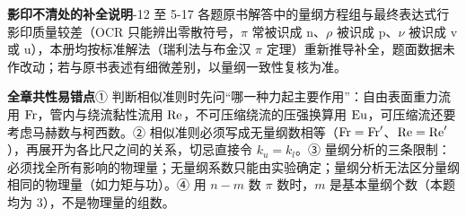 \begin{tishi}
\noindent\textbf{影印不清处的补全说明}-12 至 5-17 各题原书解答中的量纲方程组与最终表达式行影印质量较差（OCR 只能辨出零散符号，$\pi$ 常被识成 n、$\rho$ 被识成 p、$\nu$ 被识成 v 或 u），本册均按标准解法（瑞利法与布金汉 $\pi$ 定理）重新推导补全，题面数据未作改动；若与原书表述有细微差别，以量纲一致性复核为准。
\end{tishi}

\begin{yicuo}
\textbf{全章共性易错点}\quad ① 判断相似准则时先问“哪一种力起主要作用”：自由表面重力流用 $\mathrm{Fr}$，管内与绕流黏性流用 $\mathrm{Re}$，不可压缩绕流的压强换算用 $\mathrm{Eu}$，可压缩流还要考虑马赫数与柯西数。② 相似准则必须写成无量纲数相等（$\mathrm{Fr}=\mathrm{Fr}'$、$\mathrm{Re}=\mathrm{Re}'$），再展开为各比尺之间的关系，切忌直接令 $k_u=k_l$。③ 量纲分析的三条限制：必须找全所有影响的物理量；无量纲系数只能由实验确定；量纲分析无法区分量纲相同的物理量（如力矩与功）。④ 用 $n-m$ 数 $\pi$ 数时，$m$ 是基本量纲个数（本题均为 3），不是物理量的组数。
\end{yicuo}
